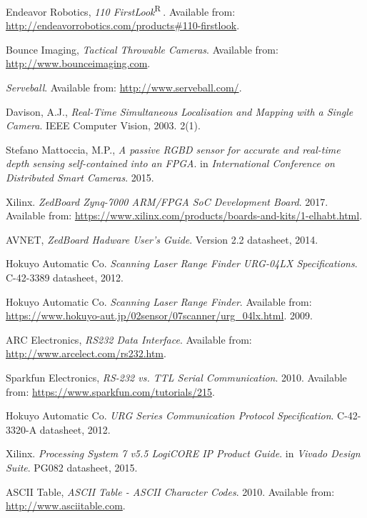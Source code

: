 \begin{thebibliography}{100}

 Endeavor Robotics, \textit{110 FirstLook}\textsuperscript{\textcircled{R}}. Available from: \url{http://endeavorrobotics.com/products#110-firstlook}.

 Bounce Imaging, \textit{Tactical Throwable Cameras}. Available from: \url{http://www.bounceimaging.com}.

 \textit{Serveball}.
Available from: \url{http://www.serveball.com/}.

 Davison, A.J.,
\textit{Real-Time Simultaneous Localisation and Mapping with a Single Camera}. 
IEEE Computer Vision, 2003. 2(1).

 Stefano Mattoccia, M.P.,
\textit{A passive RGBD sensor for accurate and real-time depth sensing self-contained into an FPGA}.
in \textit{International Conference on Distributed Smart Cameras}. 2015.

 Xilinx. \textit{ZedBoard Zynq-7000 ARM/FPGA SoC Development Board}. 2017. Available from: \url{https://www.xilinx.com/products/boards-and-kits/1-elhabt.html}.

 AVNET, \textit{ZedBoard Hadware User's Guide}. Version 2.2 datasheet, 2014.

 Hokuyo Automatic Co. \textit{Scanning Laser Range Finder URG-04LX Specifications}. C-42-3389 datasheet, 2012.

 Hokuyo Automatic Co. \textit{Scanning Laser Range Finder}. Available from: \url{https://www.hokuyo-aut.jp/02sensor/07scanner/urg_04lx.html}. 2009.

 ARC Electronics, \textit{RS232 Data Interface}. Available from: \url{http://www.arcelect.com/rs232.htm}.

 Sparkfun Electronics, \textit{RS-232 vs. TTL Serial Communication}. 2010. Available from: \url{https://www.sparkfun.com/tutorials/215}.

 Hokuyo Automatic Co. \textit{URG Series Communication Protocol Specification}. C-42-3320-A datasheet, 2012.

 Xilinx. \textit{Processing System 7 v5.5 LogiCORE IP Product Guide}. in \textit{Vivado Design Suite}. PG082 datasheet, 2015.

 ASCII Table, \textit{ASCII Table - ASCII Character Codes}. 2010. Available from: \url{http://www.asciitable.com}.


\end{thebibliography}
